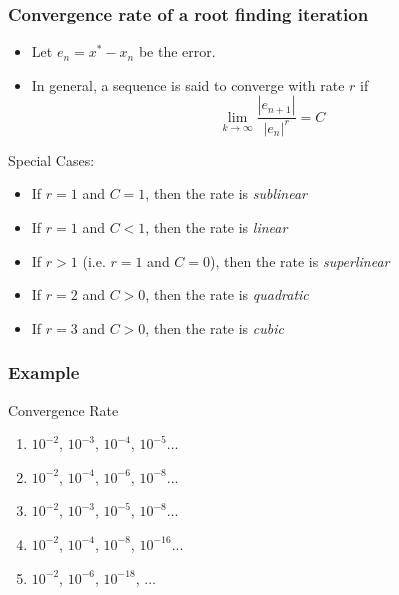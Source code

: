 \documentclass[10pt]{beamer}
\begin{document}
\begin{frame}
\frametitle{Convergence rate of a root finding iteration}
\begin{itemize}
  \item Let $e_n = x^* - x_n$ be the error.
  \item In general, a sequence is said to converge with rate $r$ if
    \begin{equation*}
      \lim_{k\rightarrow\infty} \frac{|e_{n+1}|}{|e_{n}|^{r}} = C
    \end{equation*}
\end{itemize}
\begin{block}{Special Cases:}
\begin{itemize}
  \item If $r=1$ and $C=1$, then the rate is \emph{sublinear}
  \item If $r=1$ and $C<1$, then the rate is \emph{linear}
  \item If $r>1$ (i.e. $r=1$ and $C=0$), then the rate is \emph{superlinear}
  \item If $r=2$ and $C>0$, then the rate is \emph{quadratic}
  \item If $r=3$ and $C>0$, then the rate is \emph{cubic}
\end{itemize}
\end{block}
\end{frame}
\begin{frame}
\frametitle{Example}
\begin{block}{Convergence Rate}
\begin{enumerate}
\item $10^{-2}$, $10^{-3}$, $10^{-4}$, $10^{-5}$... 
\item $10^{-2}$, $10^{-4}$, $10^{-6}$, $10^{-8}$... 
\item $10^{-2}$, $10^{-3}$, $10^{-5}$, $10^{-8}$... 
\item $10^{-2}$, $10^{-4}$, $10^{-8}$, $10^{-16}$...
\item $10^{-2}$, $10^{-6}$, $10^{-18}$, ... 
\end{enumerate}
\end{block}
\end{frame}
\end{document}
